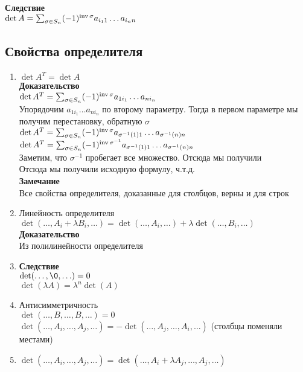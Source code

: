 \documentclass[12pt]{article}
\begin{document}
\textbf{Следствие}\\
$\det A = \sum_{\sigma \in S_n} (-1)^{\operatorname{inv}\sigma}a_{i_11}\ldots a_{i_nn}$\\
\subsection{Свойства определителя}
\begin{enumerate}
    \item $\det A^T = \det A$\\
    \textbf{Доказательство}\\
    $\det A^T = \sum_{\sigma \in S_n} (-1)^{\operatorname{inv}\sigma}a_{1i_1}\ldots a_{ni_n}$\\
    Упорядочим $a_{1i_1}\ldots a_{ni_n}$ по второму параметру. Тогда в первом параметре мы получим перестановку, обратную $\sigma$\\
    $\det A^T = \sum_{\sigma \in S_n} (-1)^{\operatorname{inv}\sigma}a_{\sigma^{-1}(1)1}\ldots a_{\sigma^{-1}(n)n}$\\
    $\det A^T = \sum_{\sigma \in S_n} (-1)^{\operatorname{inv}\sigma^{-1}}a_{\sigma^{-1}(1)1}\ldots a_{\sigma^{-1}(n)n}$\\
    Заметим, что $\sigma^{-1}$ пробегает все множество. Отсюда мы получили\\
    Отсюда мы получили исходную формулу, ч.т.д.\\
    \textbf{Замечание}\\
    Все свойства определителя, доказанные для столбцов, верны и для строк
    \item Линейность определителя\\
    $\det(\ldots, A_i+\lambda B_i, \ldots) = \det(\ldots, A_i, \ldots) + \lambda \det(\ldots, B_i, \ldots)$\\
    \textbf{Доказательство}\\
    Из полилинейности определителя\\
    \item \textbf{Следствие}\\
    $\det(\ldots, \0, \ldots) = 0$\\
    $\det(\lambda A) = \lambda^n \det(A)$
    \item Антисимметричность\\
    $\det (\ldots, B, \ldots, B, \ldots) = 0$\\
    $\det (\ldots, A_i, \ldots, A_j, \ldots) = -\det (\ldots, A_j, \ldots, A_i, \ldots)$ (столбцы поменяли местами)
    \item $\det(\ldots, A_i, \ldots, A_j, \ldots) = \det (\ldots, A_i+\lambda A_j, \ldots, A_j, \ldots)$

\end{enumerate}
\end{document}
